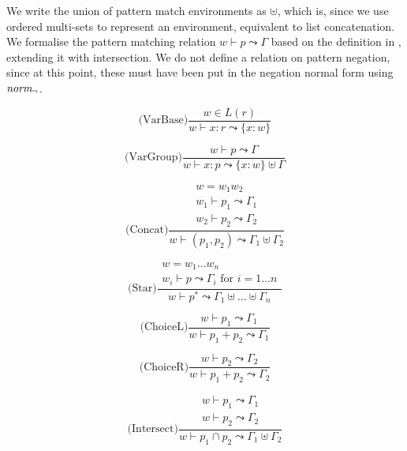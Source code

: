 We write the union of pattern match environments as $\uplus$, which is, since we
use ordered multi-sets to represent an environment, equivalent to list
concatenation. We formalise the pattern matching relation $w \vdash p \leadsto
\Gamma$ based on the definition in \cite{pdpat}, extending it with
intersection. We do not define a relation on pattern negation, since at this
point, these must have been put in the negation normal form using $\mathit{norm_\neg}$.

\begin{minipage}[t]{0.4\textwidth}
   \[\text{(VarBase)} \frac
      {w \in L(r)}
      {w \vdash x : r \leadsto \{x : w\}}
   \]
\end{minipage}
\begin{minipage}[t]{0.4\textwidth}
   \[\text{(VarGroup)} \frac
      {w \vdash p \leadsto \Gamma}
      {w \vdash x : p \leadsto \{x : w\} \uplus \Gamma}
   \]
\end{minipage}

\begin{minipage}[t]{0.4\textwidth}
\[\text{(Concat)} \frac
   {\begin{array}{c}
      w = w_1 w_2 \\
      w_1 \vdash p_1 \leadsto \Gamma_1 \\
      w_2 \vdash p_2 \leadsto \Gamma_2
   \end{array}}     
   {w \vdash (p_1, p_2) \leadsto \Gamma_1 \uplus \Gamma_2}
\]
\end{minipage}
\begin{minipage}[t]{0.4\textwidth}
\[\text{(Star)} \frac
   {\begin{array}{c}
      w = w_1 \dots w_n \\
      w_i \vdash p \leadsto \Gamma_i \text{ for } i = 1 \dots n
   \end{array}}     
   {w \vdash p^* \leadsto \Gamma_1 \uplus \dots \uplus \Gamma_n}
\]
\end{minipage}

\begin{minipage}[t]{0.4\textwidth}
\[\text{(ChoiceL)} \frac
   {w \vdash p_1 \leadsto \Gamma_1}
   {w \vdash p_1 + p_2 \leadsto \Gamma_1}
\]
\end{minipage}
\begin{minipage}[t]{0.4\textwidth}
\[\text{(ChoiceR)} \frac
   {w \vdash p_2 \leadsto \Gamma_2}
   {w \vdash p_1 + p_2 \leadsto \Gamma_2}
\]
\end{minipage}

\[\text{(Intersect)} \frac
   {\begin{array}{c}
      w \vdash p_1 \leadsto \Gamma_1 \\
      w \vdash p_2 \leadsto \Gamma_2
   \end{array}}     
   {w \vdash p_1 \cap p_2 \leadsto \Gamma_1 \uplus \Gamma_2}
\]

